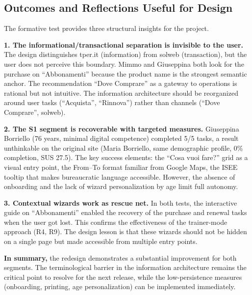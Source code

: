 ﻿\documentclass[11pt,a4paper]{article}
\begin{document}
\subsection*{Outcomes and Reflections Useful for Design}
\begin{tcolorbox}[base]
The formative test provides three structural insights for the project.

\medskip

\noindent\textbf{1. The informational/transactional separation is invisible
to the user.} The design distinguishes tper.it (information) from solweb
(transaction), but the user does not perceive this boundary. Mimmo and
Giuseppina both look for the purchase on ``Abbonamenti'' because the product name
is the strongest semantic anchor. The recommendation ``Dove
Comprare'' as a gateway to operations is rational but not
intuitive. The information architecture should be reorganized around
user tasks (``Acquista'', ``Rinnova'') rather than channels
(``Dove Comprare'', solweb).

\medskip

\noindent\textbf{2. The S1 segment is recoverable with targeted measures.}
Giuseppina Borriello (76 years, minimal digital competence) completed
5/5 tasks, a result unthinkable on the original site (Maria Borriello,
same demographic profile, 0\% completion, SUS 27.5). The key
success elements: the ``Cosa vuoi fare?'' grid as a visual entry point,
the From--To format familiar from Google Maps, the ISEE tooltip that
makes bureaucratic language accessible. However, the absence of
onboarding and the lack of wizard personalization by age limit
full autonomy.

\medskip

\noindent\textbf{3. Contextual wizards work as rescue net.}
In both tests, the interactive guide on ``Abbonamenti''
enabled the recovery of the purchase and renewal tasks when the user got
lost. This confirms the effectiveness of the trainer-mode approach (R4,
R9). The design lesson is that these wizards should not be
hidden on a single page but made accessible from multiple entry
points.

\medskip

\noindent\textbf{In summary,} the redesign demonstrates a substantial
improvement for both segments. The terminological barrier
in the information architecture remains the critical point to resolve for the
next release, while the low-persistence measures
(onboarding, printing, age personalization) can be implemented
immediately.
\end{tcolorbox}
\end{document}
